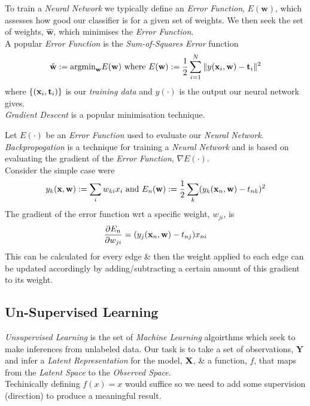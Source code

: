 \documentclass[11pt,a4paper]{article}
\begin{document}
To train a \textit{Neural Network} we typically define an \textit{Error Function}, $E(\textbf{w})$, which assesses how good our classifier is for a given set of weights. We then seek the set of weights, $\hat{\textbf{w}}$, which minimises the \textit{Error Function}.\\
A popular \textit{Error Function} is the \textit{Sum-of-Squares Error} function
$$\hat{\textbf{w}}:=\text{argmin}_\textbf{w}E(\textbf{w})\text{ where }E(\textbf{w}):=\frac12\sum_{i=1}^N\|y(\textbf{x}_i,\textbf{w})-\textbf{t}_i\|^2$$
where $\{(\textbf{x}_i,\textbf{t}_i)\}$ is our \textit{training data} and $y(\cdot)$ is the output our neural network gives.\\
\nb \textit{Gradient Descent} is a popular minimisation technique.\\


Let $E(\cdot)$ be an \textit{Error Function} used to evaluate our \textit{Neural Network}.\\
\textit{Backpropogation} is a technique for training a \textit{Neural Network} and is based on evaluating the gradient of the \textit{Error Function}, $\nabla E(\cdot)$.\\
Consider the simple case were
$$y_k(\textbf{x},\textbf{w}):=\sum_iw_{ki}x_i\text{ and }E_n(\textbf{w}):=\frac{1}{2}\sum_k(y_k(\textbf{x}_n,\textbf{w})-t_{nk})^2$$
The gradient of the error function wrt a specific weight, $w_{ji}$, is
$$\frac{\partial E_n}{\partial w_{ji}}=(y_j(\textbf{x}_n,\textbf{w})-t_{nj})x_{ni}$$
This can be calculated for every edge \& then the weight applied to each edge can be updated accordingly by adding/subtracting a certain amount of this gradient to its weight.

\subsection{Un-Supervised Learning}

\textit{Unsupervised Learning} is the set of \textit{Machine Learning} algoirthms which seek to make inferences from unlabeled data. Our task is to take a set of observations, $\textbf{Y}$ and infer a \textit{Latent Representation} for the model, $\textbf{X}$, \& a function, $f$, that maps from the \textit{Latent Space} to the \textit{Observed Space}.\\
\nb Techinically defining $f(x)=x$ would suffice so we need to add some supervision (direction) to produce a meaningful result.\\
\end{document}
